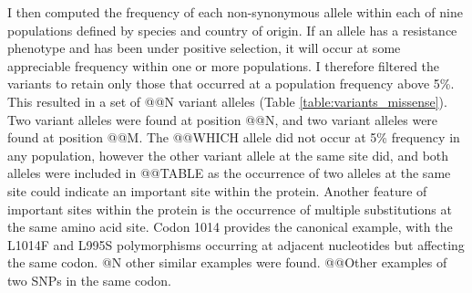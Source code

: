 \documentclass[a4paper,11pt,abstracton,hidelinks]{scrartcl}
\begin{document}
%
I then computed the frequency of each non-synonymous allele within each of nine populations defined by species and country of origin.
%
If an allele has a resistance phenotype and has been under positive selection, it will occur at some appreciable frequency within one or more populations.
%
I therefore filtered the variants to retain only those that occurred at a population frequency above 5\%.
%
This resulted in a set of @@N variant alleles (Table \ref{table:variants_missense}).
%
Two variant alleles were found at position @@N, and two variant alleles were found at position @@M.
%
The @@WHICH allele did not occur at 5\% frequency in any population, however the other variant allele at the same site did, and both alleles were included in @@TABLE as the occurrence of two alleles at the same site could indicate an important site within the protein.
%
Another feature of important sites within the protein is the occurrence of multiple substitutions at the same amino acid site.
%
Codon 1014 provides the canonical example, with the L1014F and L995S polymorphisms occurring at adjacent nucleotides but affecting the same codon.
%
@N other similar examples were found.
%
@@Other examples of two SNPs in the same codon.
\end{document}
